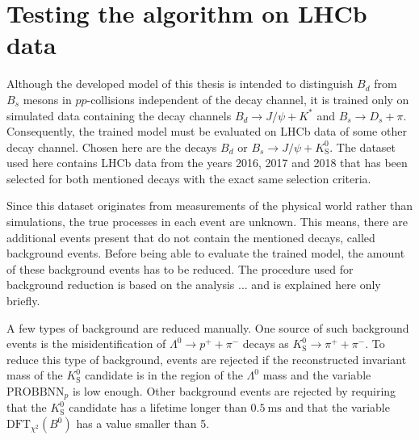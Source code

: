 \section{Testing the algorithm on LHCb data}



Although the developed model of this thesis is intended to distinguish $B_d$ from $B_s$ mesons in $pp$-collisions independent of the decay channel, it is trained only on simulated data containing the decay channels $B_d \rightarrow J/\psi + K^*$ and $B_s \rightarrow D_s + \pi$.
Consequently, the trained model must be evaluated on LHCb data of some other decay channel.
Chosen here are the decays $B_d \text{ or } B_s \rightarrow J/\psi + K^0_\text{S}$.
The dataset used here contains LHCb data from the years 2016, 2017 and 2018 that has been selected for both mentioned decays with the exact same selection criteria.

Since this dataset originates from measurements of the physical world rather than simulations, the true processes in each event are unknown. This means, there are additional events present that do not contain the mentioned decays, called background events.
Before being able to evaluate the trained model, the amount of these background events has to be reduced.
The procedure used for background reduction is based on the analysis ... and is explained here only briefly.

A few types of background are reduced manually.
One source of such background events is the misidentification of $\Lambda^0 \rightarrow p^+ + \pi^-$ decays as $K^0_\text{S} \rightarrow \pi^+ + \pi^-$.
To reduce this type of background, events are rejected if the reconstructed invariant mass of the $K^0_\text{S}$ candidate is in the region of the $\Lambda^0$ mass and the variable $\text{PROBBNN}_p$ is low enough.
Other background events are rejected by requiring that the $K^0_\text{S}$ candidate has a lifetime longer than $\qty{0.5}{\ms}$ and that the variable $\text{DFT}_{\chi^2}(B^0)$ has a value smaller than 5.

